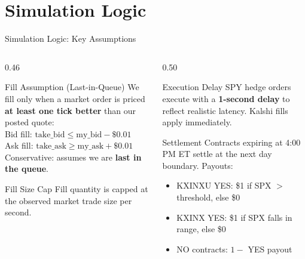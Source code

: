 \documentclass[aspectratio=169]{beamer}
\begin{document}
\section{Simulation Logic}

\begin{frame}[shrink=5]{Simulation Logic: Key Assumptions}
  \begin{columns}[T,onlytextwidth]
    \begin{column}{0.46\textwidth}
      \begin{block}{Fill Assumption (Last-in-Queue)}
        \small
        We fill only when a market order is priced \textbf{at least one tick better}
        than our posted quote:\\[4pt]
        \hspace{1em}Bid fill: $\text{take\_bid} \leq \text{my\_bid} - \$0.01$\\
        \hspace{1em}Ask fill: $\text{take\_ask} \geq \text{my\_ask} + \$0.01$\\[4pt]
        Conservative: assumes we are \textbf{last in the queue}.
      \end{block}
      \begin{block}{Fill Size Cap}
        \small
        Fill quantity is capped at the observed market trade size per second.
      \end{block}
    \end{column}
    \begin{column}{0.50\textwidth}
      \begin{block}{Execution Delay}
        \small
        SPY hedge orders execute with a \textbf{1-second delay} to reflect
        realistic latency. Kalshi fills apply immediately.
      \end{block}
      \begin{block}{Settlement}
        \small
        Contracts expiring at 4:00\,PM ET settle at the next day boundary. Payouts:
        \begin{itemize}
          \item KXINXU YES: \$1 if SPX $>$ threshold, else \$0
          \item KXINX YES: \$1 if SPX falls in range, else \$0
          \item NO contracts: $1 -$ YES payout
        \end{itemize}
      \end{block}
    \end{column}
  \end{columns}
\end{frame}
\end{document}
